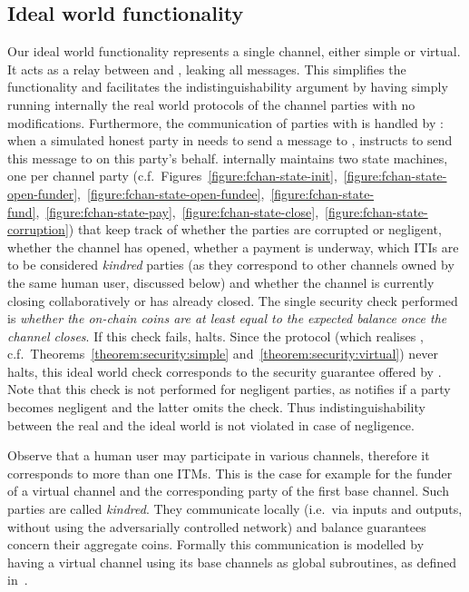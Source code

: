   \subsection{Ideal world functionality \fchan}
  Our ideal world functionality \fchan represents a single channel, either
  simple or virtual.
  It acts as a relay between \adversary and \environment, leaking all
  messages. This simplifies the functionality and facilitates the
  indistinguishability argument by having \simulator simply running internally
  the real world protocols of the channel parties \pchan with no modifications.
  Furthermore, the communication of parties with \ledger is handled by \fchan:
  when a simulated honest party in \simulator needs to send a message to
  \ledger, \simulator instructs \fchan to send this message to \ledger on this
  party's behalf.
  \fchan internally maintains two state machines, one per channel party (c.f.\
  Figures~\ref{figure:fchan-state-init},~\ref{figure:fchan-state-open-funder},~\ref{figure:fchan-state-open-fundee},~\ref{figure:fchan-state-fund},~\ref{figure:fchan-state-pay},~\ref{figure:fchan-state-close},~\ref{figure:fchan-state-corruption})
  that keep track of whether the parties are corrupted or negligent, whether the
  channel has opened, whether a payment is underway, which ITIs are to be
  considered \emph{kindred} parties (as they correspond to other channels
  owned by the same human user, discussed below) and whether the channel is
  currently closing collaboratively or has already
  closed. The single security check performed is \emph{whether the on-chain
  coins are at least equal to the expected balance once the channel closes}. If
  this check fails, \fchan halts. Since the protocol \pchan (which realises
  \fchan, c.f.\ Theorems~\ref{theorem:security:simple}
  and~\ref{theorem:security:virtual}) never halts, this ideal world check
  corresponds to the security guarantee offered by \pchan. Note that this check
  is not performed for negligent parties, as \simulator notifies \fchan if a
  party becomes negligent and the latter omits the check. Thus
  indistinguishability between the real and the ideal world is not violated in
  case of negligence.

  Observe that a human user may participate in various channels, therefore it
  corresponds to more than one ITMs. This is the case for example for the funder
  of a virtual channel and the corresponding party of the first base channel.
  Such parties are called \emph{kindred}. They communicate locally (i.e.\ via
  inputs and outputs, without using the adversarially controlled network) and
  balance guarantees concern their aggregate coins. Formally this communication
  is modelled by having a virtual channel using its base channels as global
  subroutines, as defined in~\cite{DBLP:conf/tcc/BadertscherCHTZ20}.

